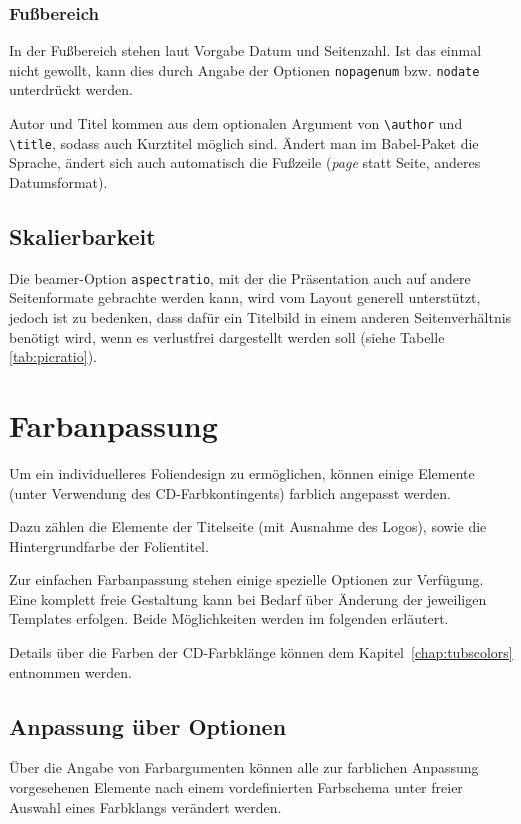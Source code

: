 \subsubsection{Fußbereich}

In der Fußbereich stehen laut Vorgabe Datum und Seitenzahl.
Ist das einmal nicht gewollt, kann dies durch Angabe der Optionen
\lstinline{nopagenum} bzw. \lstinline{nodate} unterdrückt werden.

Autor und Titel kommen aus dem optionalen Argument von \lstinline{\author}
und \lstinline{\title}, sodass auch Kurztitel möglich sind.
Ändert man im Babel-Paket die Sprache, ändert sich auch automatisch
die Fußzeile (\textit{page} statt Seite, anderes Datumsformat).


\subsection{Skalierbarkeit}

Die beamer-Option \lstinline{aspectratio}, mit der die Präsentation auch auf
andere Seitenformate gebrachte werden kann, wird vom Layout generell
unterstützt, jedoch ist zu bedenken, dass dafür ein Titelbild in einem anderen
Seitenverhältnis benötigt wird, wenn es verlustfrei dargestellt werden soll
(siehe Tabelle \ref{tab:picratio}).


\section{Farbanpassung}

Um ein individuelleres Foliendesign zu ermöglichen, können einige Elemente
(unter Verwendung des CD-Farbkontingents)
farblich angepasst werden.

Dazu zählen die Elemente der Titelseite (mit Ausnahme des Logos),
sowie die Hintergrundfarbe der Folientitel.

Zur einfachen Farbanpassung stehen einige spezielle Optionen zur Verfügung.
Eine komplett freie Gestaltung kann bei Bedarf über Änderung der
jeweiligen Templates erfolgen. Beide Möglichkeiten werden im folgenden
erläutert.

Details über die Farben der CD-Farbklänge können dem
Kapitel~\ref{chap:tubscolors} entnommen werden.

\subsection{Anpassung über Optionen}

Über die Angabe von Farbargumenten können alle zur farblichen Anpassung
vorgesehenen Elemente nach einem vordefinierten Farbschema unter freier Auswahl
eines Farbklangs verändert werden.

